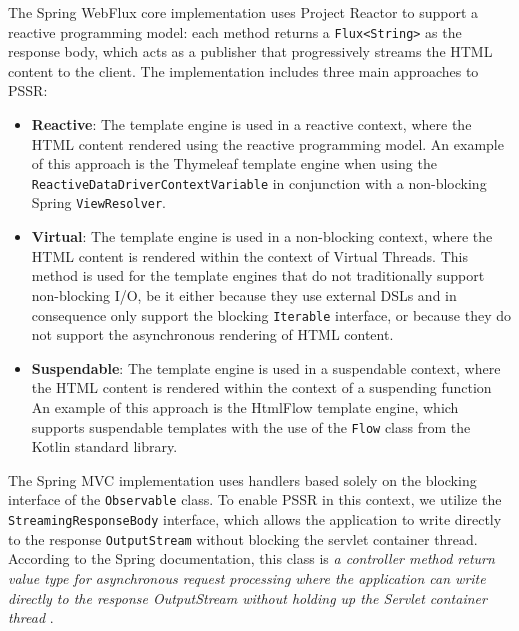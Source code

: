 The Spring WebFlux core implementation uses Project Reactor to support a
reactive programming model: each method returns a \texttt{Flux<String>} as the
response body, which acts as a publisher that progressively streams the HTML
content to the client. The implementation includes three main approaches to
PSSR:
\begin{itemize}
  \item \textbf{Reactive}: The template engine is used in a reactive context,
        where the HTML content rendered using the reactive programming model.
        An example of this approach is the Thymeleaf template engine
        when using the \texttt{ReactiveDataDriverContextVariable} in conjunction with a
        non-blocking Spring \texttt{ViewResolver}.
  \item \textbf{Virtual}: The template engine is used in a non-blocking
        context, where the HTML content is rendered within the context of Virtual
        Threads. This method is used for the template engines that do not traditionally
        support non-blocking I/O, be it either because they use external DSLs and in
        consequence only support the blocking \texttt{Iterable} interface, or
        because they do not support the asynchronous rendering of HTML content.
  \item \textbf{Suspendable}: The template engine is used in a suspendable
        context, where the HTML content is rendered within the context of a suspending function
        An example of this approach is the HtmlFlow template engine, which
        supports suspendable templates with the use of the \texttt{Flow} class from the
        Kotlin standard library.
\end{itemize}
The Spring MVC implementation uses handlers based solely on the blocking
interface of the \texttt{Observable} class. To enable PSSR in this context, we
utilize the \texttt{StreamingResponseBody} interface, which allows the
application to write directly to the response \texttt{OutputStream} without
blocking the servlet container thread. According to the Spring documentation,
this class is \textit{a controller method return value type for asynchronous
  request processing where the application can write directly to the response
  OutputStream without holding up the Servlet container thread}
\cite{Spring-StreamingResponseBody}.

